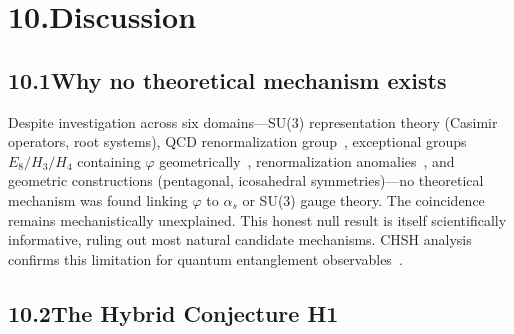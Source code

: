 \documentclass[10pt,a4paper]{article}
\begin{document}
\section*{10.\quad Discussion}

\subsection*{10.1\quad Why no theoretical mechanism exists}

Despite investigation across six domains---SU(3) representation theory (Casimir operators, root
systems), QCD renormalization group~\cite{GrossWilczek1973}, exceptional groups $E_8/H_3/H_4$
containing $\varphi$ geometrically~\cite{Baez2002}, renormalization anomalies~\cite{Adler1969},
and geometric constructions (pentagonal, icosahedral symmetries)---no theoretical mechanism was
found linking $\varphi$ to $\alpha_s$ or SU(3) gauge theory. The coincidence remains
mechanistically unexplained. This honest null result is itself scientifically informative,
ruling out most natural candidate mechanisms. CHSH analysis confirms this limitation for
quantum entanglement observables~\cite{chsh1969}.

\subsection*{10.2\quad The Hybrid Conjecture H1}
\end{document}
